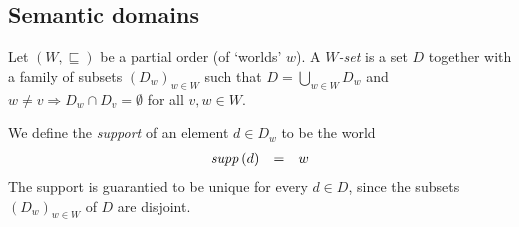 \documentclass[12pt,a4paper]{report}
\begin{document}
%
%
%




\subsection{Semantic domains}

\begin{definition}
  Let $(W,\sqsubseteq)$ be a partial order (of `worlds' $w$).
  A {\em $W$-set} is a set $D$ together with a family of subsets $(D_w)_{w\in W}$ such that
  $D = \bigcup_{w\in W} D_w$ and $w \ne v \Rightarrow D_w \cap D_v = \emptyset$
  for all $v,w \in W$.
\end{definition}

We define the {\em support} of an element $d\in D_w$ to be the world
\[\begin{array}{rcl}
  \mathit{supp}\,(d) &=& w
\end{array}\]
The support is guarantied to be unique for every $d \in D$, since the subsets
$(D_w)_{w\in W}$ of $D$ are disjoint.
\end{document}
